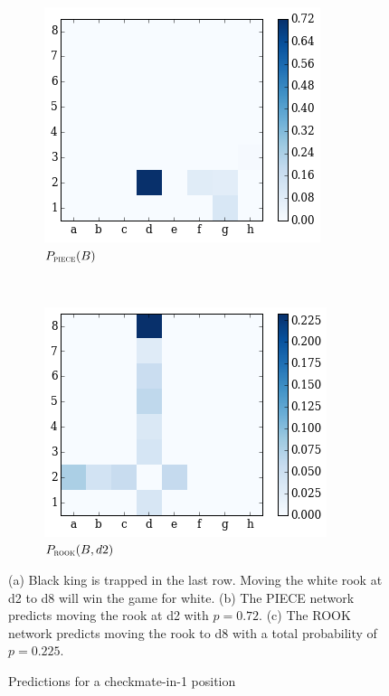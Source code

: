 \begin{figure}[H]
 \hspace*{-0.5in}  
    \begin{subfigure}[t]{0.5\textwidth}
        \centering
        \includegraphics[width=\textwidth]{img/best_moves/output_21_2.png}
        \caption{$P_{\textsc{piece}}(B)$}
    \end{subfigure}
    ~
    \begin{subfigure}[t]{0.5\textwidth}
        \centering
        \includegraphics[width=\textwidth]{img/best_moves/output_21_6.png}
        \caption{$P_{\textsc{rook}}(B, d2)$}
    \end{subfigure}%
    \caption{Predictions for a checkmate-in-1 position}
\small
\justifying
(a) Black king is trapped in the last row. Moving the white rook 
at d2 to d8 will win the game for white. (b) The \textsc{PIECE} network 
predicts moving the rook at d2 with $p=0.72$. (c) The \textsc{ROOK} network 
predicts moving the rook to d8 with a total probability of $p=0.225$.

\label{figure:checkmating}
\end{figure}


